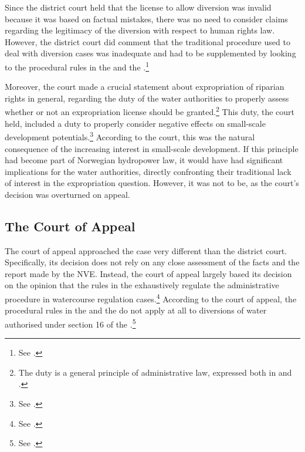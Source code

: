 Since the district court held that the license to allow diversion was invalid because it was based on factual mistakes, there was no need to consider claims regarding the legitimacy of the diversion with respect to human rights law. However, the district court did comment that the traditional procedure used to deal with diversion cases was inadequate and had to be supplemented by looking to the procedural rules in the \cite{ea59} and the \cite{paa67}.\footnote{See \cite[21]{jorpeland09}.} 

Moreover, the court made a crucial statement about expropriation of riparian rights in general, regarding the duty of the water authorities to properly assess whether or not an expropriation license should be granted.\footnote{The duty is a general principle of administrative law, expressed both in \cite[12]{ea59} and \cite[16]{paa67}.} This duty, the court held, included a duty to properly consider negative effects on small-scale development potentials.\footnote{See \cite[22]{jorpeland09}.} According to the court, this was the natural consequence of the increasing interest in small-scale development. If this principle had become part of Norwegian hydropower law, it would have had significant implications for the water authorities, directly confronting their traditional lack of interest in the expropriation question. However, it was not to be, as the court's decision was overturned on appeal.

\subsection{The Court of Appeal}

The court of appeal approached the case very different than the district court. Specifically, its decision does not rely on any close assessment of the facts and the report made by the NVE. Instead, the court of appeal largely based its decision on the opinion that the rules in the \cite{wra17} exhaustively regulate the administrative procedure in watercourse regulation cases.\footnote{See \cite[7]{jorpeland11a}.} According to the court of appeal, the procedural rules in the \cite{ea59} and the \cite{paa67} do not apply at all to diversions of water authorised under section 16 of the \cite{wra17}.\footnote{See \cite[7]{jorpeland11a}.} 

